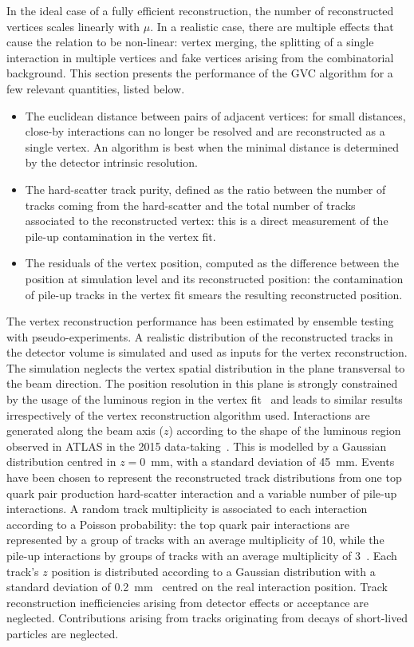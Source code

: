 \documentclass[a4paper,11pt]{article}
\begin{document}
In the ideal case of a fully efficient reconstruction, the number of reconstructed vertices scales linearly with $\mu$. In a realistic case, there are multiple effects that cause the relation to be non-linear: vertex merging, the splitting of a single interaction in multiple vertices and fake vertices arising from the combinatorial background. This section presents the performance of the GVC algorithm for a few relevant quantities, listed below.
\begin{itemize}
	\item The euclidean distance between pairs of adjacent vertices: for small distances, close-by interactions can no longer be resolved and are reconstructed as a single vertex. An algorithm is best when the minimal distance is determined by the detector intrinsic resolution.
	\item The hard-scatter track purity, defined as the ratio between the number of tracks coming from the hard-scatter and the total number of tracks associated to the reconstructed vertex: this is a direct measurement of the pile-up contamination in the vertex fit.
	\item The residuals of the vertex position, computed as the difference between the position at simulation level and its reconstructed position: the contamination of pile-up tracks in the vertex fit smears the resulting reconstructed position.
\end{itemize}

The vertex reconstruction performance has been estimated by ensemble testing with pseudo-experiments. A realistic distribution of the reconstructed tracks in the detector volume is simulated and used as inputs for the vertex reconstruction. The simulation neglects the vertex spatial distribution in the plane transversal to the beam direction. The position resolution in this plane is strongly constrained by the usage of the luminous region in the vertex fit~\cite{Aaboud:2016rmg} and leads to similar results irrespectively of the vertex reconstruction algorithm used. Interactions are generated along the beam axis ($z$) according to the shape of the luminous region observed in ATLAS in the 2015 data-taking~\cite{Beamspotpage}. This is modelled by a Gaussian distribution centred in $z=0$~mm, with a standard deviation of 45~mm. Events have been chosen to represent the reconstructed track distributions from one top quark pair production hard-scatter interaction and a variable number of pile-up interactions. A random track multiplicity is associated to each interaction according to a Poisson probability: the top quark pair interactions are represented by a group of tracks with an average multiplicity of 10, while the pile-up interactions by groups of tracks with an average multiplicity of 3~\cite{Aaboud:2016rmg}. Each track's $z$ position is distributed according to a Gaussian distribution with a standard deviation of 0.2~mm~\cite{Aaboud:2016rmg} centred on the real interaction position. Track reconstruction inefficiencies arising from  detector effects or acceptance are neglected. Contributions arising from tracks originating from decays of short-lived particles are neglected. 
\end{document}
